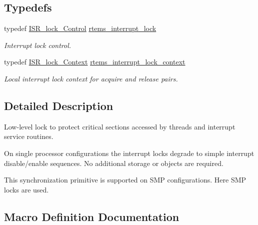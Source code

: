 \subsection*{Typedefs}
\begin{DoxyCompactItemize}
\item 
\mbox{\label{group__ClassicINTRLocks_ga7d4b54b01fd1507aa842d5fbc7b11177}} 
typedef \mbox{\hyperlink{structISR__lock__Control}{I\+S\+R\+\_\+lock\+\_\+\+Control}} \mbox{\hyperlink{group__ClassicINTRLocks_ga7d4b54b01fd1507aa842d5fbc7b11177}{rtems\+\_\+interrupt\+\_\+lock}}
\begin{DoxyCompactList}\small\item\em Interrupt lock control. \end{DoxyCompactList}\item 
\mbox{\label{group__ClassicINTRLocks_gab9d4b488f1537323799db7c1fa69b9aa}} 
typedef \mbox{\hyperlink{structISR__lock__Context}{I\+S\+R\+\_\+lock\+\_\+\+Context}} \mbox{\hyperlink{group__ClassicINTRLocks_gab9d4b488f1537323799db7c1fa69b9aa}{rtems\+\_\+interrupt\+\_\+lock\+\_\+context}}
\begin{DoxyCompactList}\small\item\em Local interrupt lock context for acquire and release pairs. \end{DoxyCompactList}\end{DoxyCompactItemize}


\subsection{Detailed Description}
Low-\/level lock to protect critical sections accessed by threads and interrupt service routines. 

On single processor configurations the interrupt locks degrade to simple interrupt disable/enable sequences. No additional storage or objects are required.

This synchronization primitive is supported on S\+MP configurations. Here S\+MP locks are used. 

\subsection{Macro Definition Documentation}
\mbox{\label{group__ClassicINTRLocks_ga0eeb7f40f9ac9e9c7b092d5fd85b5b3c}} 
